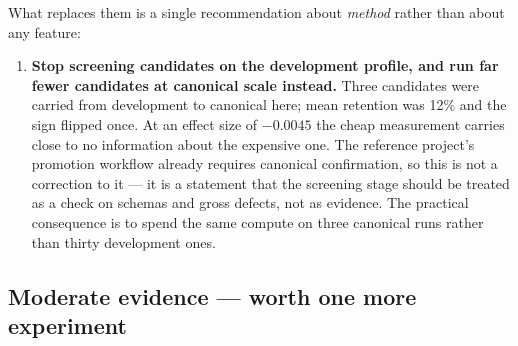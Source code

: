 \documentclass[11pt,a4paper]{article}
\begin{document}
What replaces them is a single recommendation about \emph{method} rather than about
any feature:

\begin{enumerate}\itemsep3pt
\item \textbf{Stop screening candidates on the development profile, and run far
fewer candidates at canonical scale instead.} Three candidates were carried from
development to canonical here; mean retention was 12\% and the sign flipped once. At
an effect size of $-0.0045$ the cheap measurement carries close to no information
about the expensive one. The reference project's promotion workflow already requires
canonical confirmation, so this is not a correction to it --- it is a statement that
the screening stage should be treated as a check on schemas and gross defects, not
as evidence. The practical consequence is to spend the same compute on three
canonical runs rather than thirty development ones.
\end{enumerate}

\subsection*{Moderate evidence --- worth one more experiment}
\end{document}
